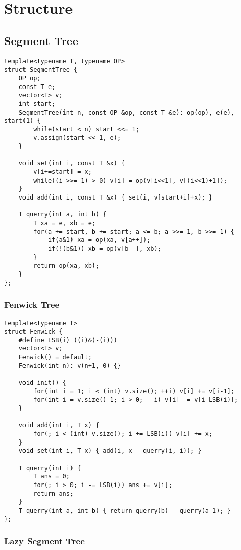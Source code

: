 \documentclass[a4paper,9pt]{article}
\begin{document}
\section{Structure}
	
\subsection{Segment Tree}
	
\begin{lstlisting}
template<typename T, typename OP>
struct SegmentTree {
	OP op;
	const T e;
	vector<T> v;
	int start;
	SegmentTree(int n, const OP &op, const T &e): op(op), e(e), start(1) {
		while(start < n) start <<= 1;
		v.assign(start << 1, e);
	}
	
	void set(int i, const T &x) {
		v[i+=start] = x;
		while((i >>= 1) > 0) v[i] = op(v[i<<1], v[(i<<1)+1]);
	}
	void add(int i, const T &x) { set(i, v[start+i]+x); }
	
	T querry(int a, int b) {
		T xa = e, xb = e;
		for(a += start, b += start; a <= b; a >>= 1, b >>= 1) {
			if(a&1) xa = op(xa, v[a++]);
			if(!(b&1)) xb = op(v[b--], xb);
		}
		return op(xa, xb);
	}
};
\end{lstlisting}

\subsubsection{Fenwick Tree}
	
\begin{lstlisting}
template<typename T>
struct Fenwick {
	#define LSB(i) ((i)&(-(i)))
	vector<T> v;
	Fenwick() = default;
	Fenwick(int n): v(n+1, 0) {}
	
	void init() {
		for(int i = 1; i < (int) v.size(); ++i) v[i] += v[i-1];
		for(int i = v.size()-1; i > 0; --i) v[i] -= v[i-LSB(i)];
	}
	
	void add(int i, T x) {
		for(; i < (int) v.size(); i += LSB(i)) v[i] += x;
	}
	void set(int i, T x) { add(i, x - querry(i, i)); }
	
	T querry(int i) {
		T ans = 0;
		for(; i > 0; i -= LSB(i)) ans += v[i];
		return ans;
	}
	T querry(int a, int b) { return querry(b) - querry(a-1); }
};
\end{lstlisting}

\subsubsection{Lazy Segment Tree}
\end{document}
